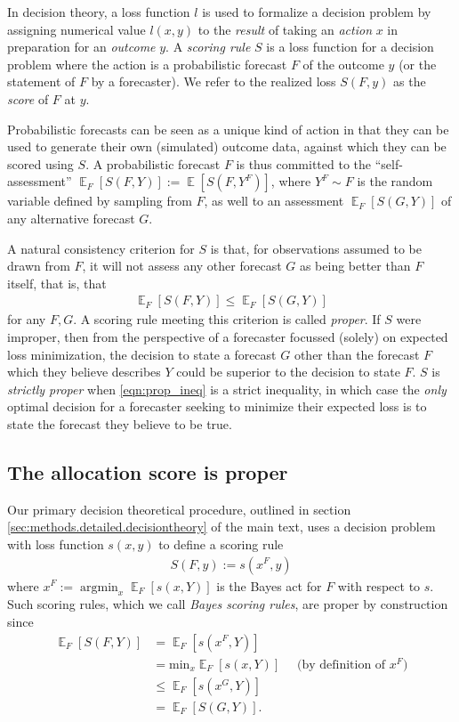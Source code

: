 \documentclass{article}
\DeclareMathOperator*{\argmin}{argmin}
\DeclareMathOperator{\Ex}{\mathbb{E}}
\begin{document}
In decision theory, a loss function $l$ is used to formalize a decision problem by assigning numerical value $l(x,y)$ to the
\emph{result} of taking an \emph{action} $x$ in preparation for an \emph{outcome} $y$. A \emph{scoring rule} $S$ is a
loss function for a decision problem where the action is a probabilistic forecast $F$ of the outcome $y$ (or the statement of $F$ by a forecaster).
We refer to the realized loss $S(F,y)$ as the \emph{score} of $F$ at $y$.

Probabilistic forecasts can be seen as a unique kind of action in that they can be used to generate their
own (simulated) outcome data, against which they can be scored using $S$. A probabilistic forecast
$F$ is thus committed to the ``self-assessment'' $\Ex_F [S(F, Y)] := \Ex [S(F, Y^F)]$, where $Y^F \sim F$ is the random variable defined
by sampling from $F$, as well to an assessment $\Ex_F [S(G, Y)]$ of any alternative forecast $G$.

A natural consistency criterion for $S$ is that, for observations assumed to be drawn from $F$, it will not assess any other forecast $G$
as being better than $F$ itself, that is, that
\begin{align}
\Ex_F [S(F, Y)] \leq \Ex_F [S(G, Y)] \label{eqn:prop_ineq}
\end{align}
for any $F,G$. A scoring rule meeting this criterion is called \emph{proper}. If $S$ were improper, then from the perspective of
a forecaster focussed (solely) on expected loss minimization, the decision to state
a forecast $G$ other than the forecast $F$ which they believe describes $Y$ could be superior to the decision to state $F$.
$S$ is \emph{strictly proper} when
\eqref{eqn:prop_ineq} is a strict inequality, in which case the
\emph{only} optimal decision for a forecaster seeking to minimize their expected loss is to state the forecast they believe to be true.

\subsection{The allocation score is proper}
\label{sec:alloscore_proper}

Our primary decision theoretical procedure, outlined in section \ref{sec:methods.detailed.decisiontheory} of the main text,
uses a decision problem with loss function $s(x,y)$ to define a scoring rule
\begin{align}
S(F,y) := s(x^F,y) \label{eqn:bayes_sr}
\end{align}
where $x^F := \argmin_{x} \Ex_F[s(x,Y)]$ is the Bayes act for $F$ with respect to $s$.
Such scoring rules, which we call \emph{Bayes scoring rules},
are proper by construction since
\begin{align}
\Ex_F [S(F, Y)] &= \Ex_F [ s(x^F, Y) ] \nonumber \\
 &= \mathrm{min}_{x} \Ex_F [ s(x, Y) ] \quad \text{ (by definition of $x^F$)} \\
 &\leq \Ex_F [ s(x^G, Y) ] \label{eqn:dt_proper_key} \\
 &= \Ex_F [ S(G, Y)]. \nonumber
\end{align}
\end{document}
